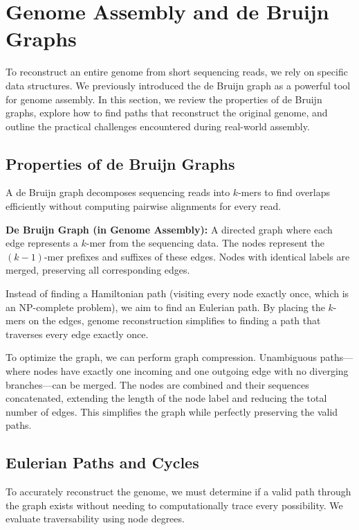 \documentclass[11pt,a4paper]{article}
\newenvironment{important}{%
    \begin{tcolorbox}[colback=blue!5, colframe=blue!80!black, arc=4mm, boxrule=1pt]
}{%
    \end{tcolorbox}
}
\begin{document}
\section{Genome Assembly and de Bruijn Graphs}
To reconstruct an entire genome from short sequencing reads, we rely on specific data structures. We previously introduced the de Bruijn graph as a powerful tool for genome assembly. In this section, we review the properties of de Bruijn graphs, explore how to find paths that reconstruct the original genome, and outline the practical challenges encountered during real-world assembly.

\subsection{Properties of de Bruijn Graphs}
A de Bruijn graph decomposes sequencing reads into $k$-mers to find overlaps efficiently without computing pairwise alignments for every read. 

\begin{important}
    \textbf{De Bruijn Graph (in Genome Assembly):} A directed graph where each edge represents a $k$-mer from the sequencing data. The nodes represent the $(k-1)$-mer prefixes and suffixes of these edges. Nodes with identical labels are merged, preserving all corresponding edges.
\end{important}

Instead of finding a Hamiltonian path (visiting every node exactly once, which is an NP-complete problem), we aim to find an Eulerian path.
By placing the $k$-mers on the edges, genome reconstruction simplifies to finding a path that traverses every edge exactly once. 

To optimize the graph, we can perform graph compression.
Unambiguous paths---where nodes have exactly one incoming and one outgoing edge with no diverging branches---can be merged. The nodes are combined and their sequences concatenated, extending the length of the node label and reducing the total number of edges. This simplifies the graph while perfectly preserving the valid paths.

\subsection{Eulerian Paths and Cycles}
To accurately reconstruct the genome, we must determine if a valid path through the graph exists without needing to computationally trace every possibility. We evaluate traversability using node degrees.
\end{document}
